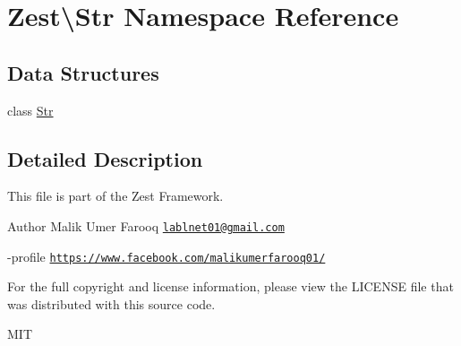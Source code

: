 \hypertarget{namespace_zest_1_1_str}{}\section{Zest\textbackslash{}Str Namespace Reference}
\label{namespace_zest_1_1_str}
\subsection*{Data Structures}
\begin{DoxyCompactItemize}
\item 
class \mbox{\hyperlink{class_zest_1_1_str_1_1_str}{Str}}
\end{DoxyCompactItemize}


\subsection{Detailed Description}
This file is part of the Zest Framework.

\begin{DoxyAuthor}{Author}
Malik Umer Farooq \href{mailto:lablnet01@gmail.com}{\tt lablnet01@gmail.\+com} 

-\/profile \href{https://www.facebook.com/malikumerfarooq01/}{\tt https\+://www.\+facebook.\+com/malikumerfarooq01/}
\end{DoxyAuthor}
For the full copyright and license information, please view the L\+I\+C\+E\+N\+SE file that was distributed with this source code.

M\+IT 